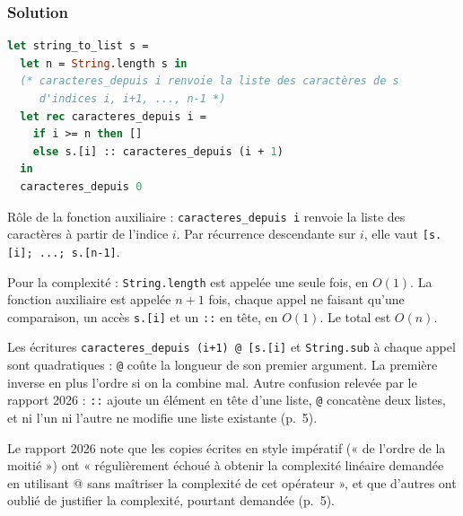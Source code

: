 \documentclass[11pt,a4paper]{article}
\begin{document}
\hypertarget{solution-14}{%
\subsubsection{Solution}\label{solution-14}}

\begin{lstlisting}[language=Caml]
let string_to_list s =
  let n = String.length s in
  (* caracteres_depuis i renvoie la liste des caractères de s
     d'indices i, i+1, ..., n-1 *)
  let rec caracteres_depuis i =
    if i >= n then []
    else s.[i] :: caracteres_depuis (i + 1)
  in
  caracteres_depuis 0
\end{lstlisting}

Rôle de la fonction auxiliaire : \texttt{caracteres\_depuis\ i} renvoie la liste des caractères à partir de l'indice \(i\). Par récurrence descendante sur \(i\), elle vaut \texttt{{[}s.{[}i{]}\allowbreak{};\allowbreak{}\ ...;\allowbreak{}\ s.{[}n-1{]}\allowbreak{}{]}\allowbreak{}}.

Pour la complexité : \texttt{String.length} est appelée une seule fois, en \(O(1)\). La fonction auxiliaire est appelée \(n+1\) fois, chaque appel ne faisant qu'une comparaison, un accès \texttt{s.{[}i{]}} et un \texttt{::} en tête, en \(O(1)\). Le total est \textbf{\(O(n)\)}.

\begin{piege}

Les écritures \texttt{caracteres\_depuis\ (\allowbreak{}i+1)\allowbreak{}\ @\ {[}s.{[}i{]}\allowbreak{}{]}\allowbreak{}} et \texttt{String.sub} à chaque appel sont quadratiques : \texttt{@} coûte la longueur de son premier argument. La première inverse en plus l'ordre si on la combine mal. Autre confusion relevée par le rapport 2026 : \texttt{::} ajoute un élément en tête d'une liste, \texttt{@} concatène deux listes, et ni l'un ni l'autre ne modifie une liste existante (p.~5).

\end{piege}

\begin{jury}

Le rapport 2026 note que les copies écrites en style impératif (« de l'ordre de la moitié ») ont « régulièrement échoué à obtenir la complexité linéaire demandée en utilisant @ sans maîtriser la complexité de cet opérateur », et que d'autres ont oublié de justifier la complexité, pourtant demandée (p.~5).

\end{jury}
\end{document}
